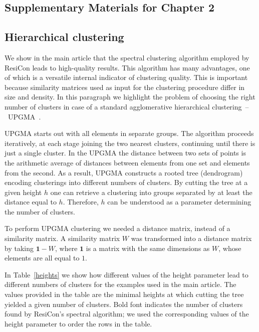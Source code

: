 \documentclass[a4paper,11pt,twoside]{book}%
\begin{document}
\begin{appendices}
  
\chapter{Supplementary Materials for Chapter 2}

\section{Hierarchical clustering}
We show in the main article that the spectral clustering algorithm employed by ResiCon leads to high-quality results.
This algorithm has many advantages, one of which is a versatile internal indicator of clustering quality.
This is important because similarity matrices used as input for the clustering procedure differ in size and density.
In this paragraph we highlight the problem of choosing the right number of clusters in case of a standard agglomerative hierarchical clustering~--~UPGMA~\cite{sokal1958statistical}.

UPGMA starts out with all elements in separate groups.
The algorithm proceeds iteratively, at each stage joining the two nearest clusters, continuing until there is just a single cluster.
In the UPGMA the distance between two sets of points is the arithmetic average of distances between elements from one set and elements from the second.
As a result, UPGMA constructs a rooted tree (dendrogram) encoding clusterings into different numbers of clusters. %
By cutting the tree at a given height $h$ one can retrieve a clustering into groups separated by at least the distance equal to $h$.
Therefore, $h$ can be understood as a parameter determining the number of clusters.

To perform UPGMA clustering we needed a distance matrix, instead of a similarity matrix.
A similarity matrix $W$ was transformed into a distance matrix by taking $\mathbf{1}-W$, where $\mathbf{1}$ is a matrix with the same dimensions as $W$, whose elements are all equal to $1$.  

In Table~\ref{heights} we show how different values of the height parameter lead to different numbers of clusters for the examples used in the main article.
The values provided in the table are the minimal heights at which cutting the tree yielded a given number of clusters.
Bold font indicates the number of clusters found by ResiCon's spectral algorithm; we used the corresponding values of the height parameter to order the rows in the table.


\end{appendices}
\end{document}

